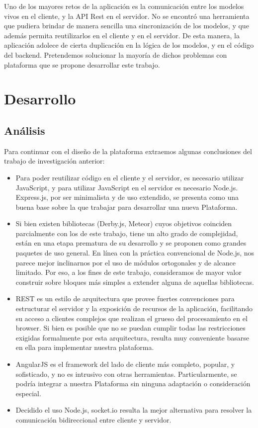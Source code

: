 \documentclass[doc,helv,longtable]{article}
\begin{document}
Uno de los mayores retos de la aplicación es la comunicación entre los modelos vivos en el cliente, y la API Rest en el servidor. No se encontró una herramienta que pudiera brindar de manera sencilla una sincronización de los modelos, y que además permita reutilizarlos en el cliente y en el servidor. De esta manera, la aplicación adolece de cierta duplicación en la lógica de los modelos, y en el código del backend. Pretendemos solucionar la mayoría de dichos problemas con plataforma que se propone desarrollar este trabajo. \section{Desarrollo}
\subsection{Análisis}


Para continuar con el diseño de la plataforma extraemos algunas conclusiones del trabajo de investigación anterior:
\begin{itemize}
\item  Para poder reutilizar código en el cliente y el servidor, es necesario utilizar JavaScript, y para utilizar JavaScript en el servidor es necesario Node.js. Express.js, por ser minimalista y de uso extendido, se presenta como una buena base sobre la que trabajar para desarrollar una nueva Plataforma.
\item  Si bien existen bibliotecas (Derby.js, Meteor) cuyos objetivos coinciden parcialmente con los de este trabajo, tiene un alto grado de complejidad, están en una etapa prematura de su desarrollo y se proponen como grandes paquetes de uso general. En línea con la práctica convencional de Node.js, nos parece mejor inclinarnos por el uso de módulos ortogonales y de alcance limitado. Por eso, a los fines de este trabajo, consideramos de mayor valor construir sobre bloques más simples a extender alguna de aquellas bibliotecas.
\item  REST es un estilo de arquitectura que provee fuertes convenciones para estructurar el servidor y la exposición de recursos de la aplicación, facilitando su acceso a clientes complejos que realizan el grueso del procesamiento en el browser. Si bien es posible que no se puedan cumplir todas las restricciones exigidas formalmente por esta arquitectura, resulta muy conveniente basarse en ella para implementar nuestra plataforma.
\item  AngularJS es el framework del lado de cliente más completo, popular, y sofisticado, y no es intrusivo con otras herramientas. Particularmente, se podría integrar a nuestra Plataforma sin ninguna adaptación o consideración especial.
\item  Decidido el uso Node.js, socket.io resulta la mejor alternativa para resolver la comunicación bidireccional entre cliente y servidor.

\end{itemize}
\end{document}
